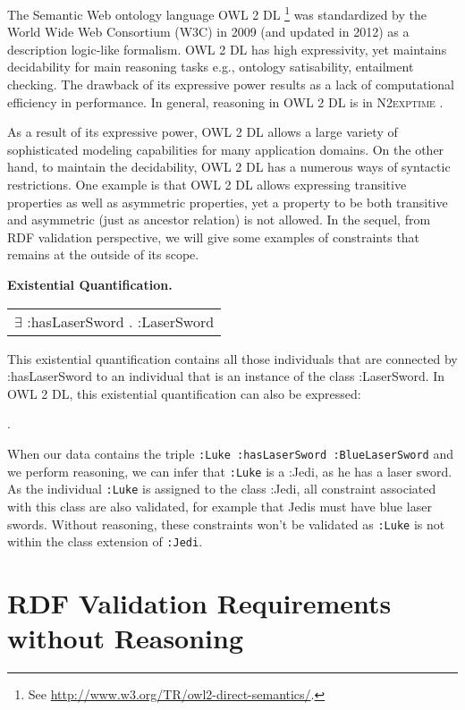 \documentclass{llncs}
\newcommand{\ms}[1]{\texttt{#1}}
\newenvironment{DL}{
  \scriptsize
  \sffamily
  \vspace{0.3cm}
  \begin{tabular}{l}

}{
  \end{tabular}
  \linebreak
}
\begin{document}
The Semantic Web ontology language OWL 2 DL \footnote{See \url{http://www.w3.org/TR/owl2-direct-semantics/}.} was standardized by
the World Wide Web Consortium (W3C) in 2009 (and updated in 2012) as a
description logic-like formalism.  OWL 2 DL has high expressivity, yet maintains  decidability for main reasoning tasks e.g., ontology satisability, 
entailment checking. The drawback of its expressive power results as a lack of computational efficiency in performance. In general, reasoning in OWL 2 DL is in \textsc{N2exptime} \cite{owl2profiles2008}. 

As a result of its expressive power, OWL 2 DL allows a large variety of sophisticated modeling capabilities for many application domains.  On the other hand, to maintain the decidability, OWL 2 DL has a numerous ways of syntactic restrictions. One example is that OWL 2 DL allows  expressing transitive properties as well as asymmetric properties, yet a property to be both transitive and asymmetric (just as ancestor relation) is not allowed. In the sequel, from RDF validation perspective, we will give some examples of constraints that remains at the outside of its scope. 



\textbf{Existential Quantification.}

\begin{DL}
$\exists$ :hasLaserSword . :LaserSword
\end{DL}

This existential quantification contains all those individuals that are connected by :hasLaserSword to an individual that is an instance of the class :LaserSword.
In OWL 2 DL, this existential quantification can also be expressed:

\begin{ex}
 .
\end{ex}

When our data contains the triple \ms{:Luke :hasLaserSword :BlueLaserSword} and we perform reasoning, we can infer that \ms{:Luke} is a :Jedi, as he has a laser sword.
As the individual \ms{:Luke} is assigned to the class :Jedi, all constraint associated with this class are also validated, for example that Jedis must have blue laser swords.
Without reasoning, these constraints won't be validated as \ms{:Luke} is not within the class extension of \ms{:Jedi}.

\section{RDF Validation Requirements without Reasoning}
\end{document}
